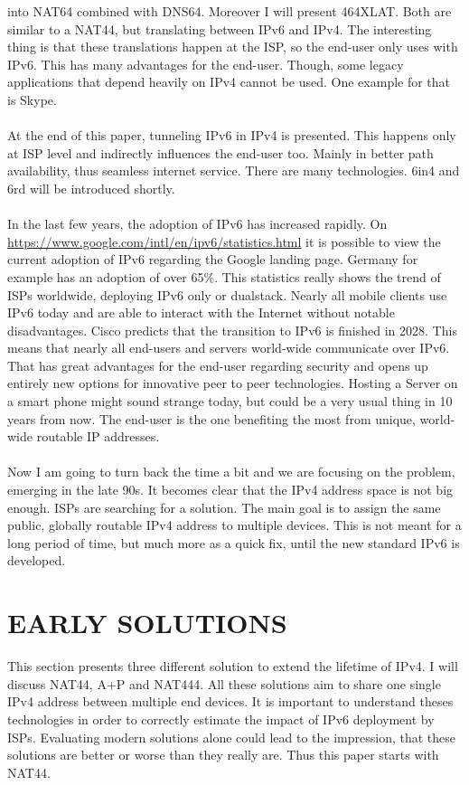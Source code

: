 \documentclass[format=sigconf, natbib=true, nonacm=true]{acmart}
\begin{document}
into NAT64 combined with DNS64. Moreover I will present 464XLAT. Both are similar to a NAT44, but translating between IPv6 and IPv4. The interesting thing is that these translations happen at the ISP, so the end-user only uses with IPv6. This has many advantages for the end-user. Though, some legacy applications that depend heavily on IPv4 cannot be used. One example for that is Skype.\\\\At the end of this paper, tunneling IPv6 in IPv4 is presented. This happens only at ISP level and indirectly influences the end-user too. Mainly in better path availability, thus seamless internet service. There are many technologies. 6in4 and 6rd will be introduced shortly.\\\\In the last few years, the adoption of IPv6 has increased rapidly. On \url{https://www.google.com/intl/en/ipv6/statistics.html} it is possible to view the current adoption of IPv6 regarding the Google landing page. Germany for example has an adoption of over 65\%. This statistics really shows the trend of ISPs worldwide, deploying IPv6 only or dualstack. Nearly all mobile clients use IPv6 today and are able to interact with the Internet without notable disadvantages. Cisco predicts that the transition to IPv6 is finished in 2028. This means that nearly all end-users and servers world-wide communicate over IPv6. That has great advantages for the end-user regarding security and opens up entirely new options for innovative peer to peer technologies. Hosting a Server on a smart phone might sound strange today, but could be a very usual thing in 10 years from now. The end-user is the one benefiting the most from unique, world-wide routable IP addresses.\\\\Now I am going to turn back the time a bit and we are focusing on the problem, emerging in the late 90s. It becomes clear that the IPv4 address space is not big enough. ISPs are searching for a solution. The main goal is to assign the same public, globally routable IPv4 address to multiple devices. This is not meant for a long period of time, but much more as a quick fix, until the new standard IPv6 is developed.
    
    \section{EARLY SOLUTIONS}
    This section presents three different solution to extend the lifetime of IPv4. I will discuss NAT44, A+P and NAT444. All these solutions aim to share one single IPv4 address between multiple end devices. It is important to understand theses technologies in order to correctly estimate the impact of IPv6 deployment by ISPs. Evaluating modern solutions alone could lead to the impression, that these solutions are better or worse than they really are. Thus this paper starts with NAT44.
\end{document}
